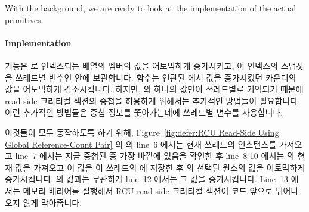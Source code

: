 With the background, we are ready to look at the implementation of the
actual primitives.
\fi

\paragraph{Implementation}

 기능은  로 인덱스되는  배열의
멤버의 값을 어토믹하게 증가시키고, 이 인덱스의 스냅샷을 쓰레드별 변수인
 안에 보관합니다.
 함수는 연관된  에서 값을 증가시켰던
카운터의 값을 어토믹하게 감소시킵니다.
하지만,  의 하나의 값만이 쓰레드별로 기억되기 때문에 read-side
크리티컬 섹션의 중첩을 허용하게 위해서는 추가적인 방법들이 필요합니다.
이런 추가적인 방법들은 중첩 정보를 쫓아가는데에 쓰레드별 
변수를 사용합니다.
\iffalse

The \co{rcu_read_lock()} primitive atomically increments the member of the
\co{rcu_refcnt[]} pair indexed by \co{rcu_idx}, and keeps a
snapshot of this index in the per-thread variable \co{rcu_read_idx}.
The \co{rcu_read_unlock()} primitive then atomically decrements
whichever counter of the pair that the corresponding \co{rcu_read_lock()}
incremented.
However, because only one value of \co{rcu_idx} is remembered per thread,
additional measures must be taken to permit nesting.
These additional measures use the per-thread \co{rcu_nesting} variable
to track nesting.
\fi

이것들이 모두 동작하도록 하기 위해,
Figure~\ref{fig:defer:RCU Read-Side Using Global Reference-Count Pair}
의  의 line~6 에서는 현재 쓰레드의 
인스턴스를 가져오고 line~7 에서는 지금 중첩된  중 가장
바깥에 있음을 확인한 후 line~8-10 에서는  의 현재 값을 가져오고 이
값을 이 쓰레드의  에 저장한 후  의 선택된
원소의 값을 어토믹하게 증가시킵니다.
 의 값과는 무관하게 line~12 에서는 그 값을 증가시킵니다.
Line~13 에서는 메모리 배리어를 실행해서 RCU read-side 크리티컬 섹션이
 코드 앞으로 튀어나오지 않게 막아줍니다.
\iffalse

To make all this work, line~6 of \co{rcu_read_lock()} in
Figure~\ref{fig:defer:RCU Read-Side Using Global Reference-Count Pair}
picks up the
current thread's instance of \co{rcu_nesting}, and if line~7 finds
that this is the outermost \co{rcu_read_lock()},
then lines~8-10 pick up the current value of
\co{rcu_idx}, save it in this thread's instance of \co{rcu_read_idx},
and atomically increment the selected element of \co{rcu_refcnt}.
Regardless of the value of \co{rcu_nesting}, line~12 increments it.
Line~13 executes a memory barrier to ensure that the RCU read-side
critical section does not bleed out before the \co{rcu_read_lock()} code.
\fi

